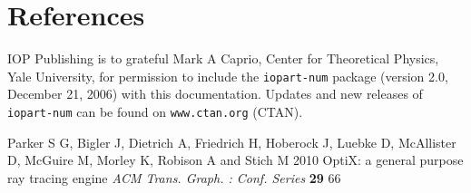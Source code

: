 \documentclass[a4paper]{jpconf}
\begin{document}
\section*{References}
\begin{thebibliography}{9}
 IOP Publishing is to grateful Mark A Caprio, Center for Theoretical Physics, Yale University, for permission to include the {\tt iopart-num} \BibTeX package (version 2.0, December 21, 2006) with  this documentation. Updates and new releases of {\tt iopart-num} can be found on \verb"www.ctan.org" (CTAN). 

 Parker S G, Bigler J, Dietrich A, Friedrich H, Hoberock J, Luebke D, McAllister D, McGuire M, Morley K, Robison A and Stich M 2010 OptiX: a general purpose ray tracing engine
{\it ACM Trans. Graph. : Conf. Series} {\bf 29} 66 




\end{thebibliography}
\end{document}
